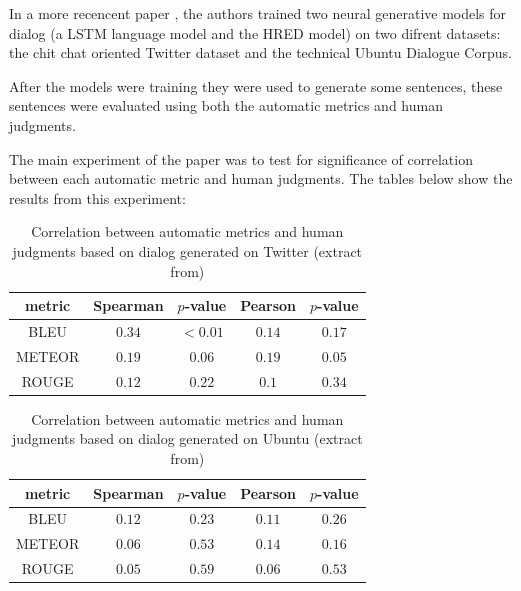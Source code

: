 In a more recencent paper \cite{LiuLSNCP16}, the authors trained two neural generative models for dialog (a LSTM language model and the HRED model) on two difrent datasets: the chit chat oriented Twitter dataset and the technical Ubuntu Dialogue Corpus.

After the models were training they were used to generate some sentences, these sentences were evaluated using both the automatic metrics and human judgments. 

The main experiment of the paper was to test for significance of correlation between each automatic metric and  human judgments. The tables below show the results from this experiment:

\begin{table}[h]
\centering
\label{hownottable}
\begin{tabular}{|c|c|c|c|c|}
\hline
\cellcolor{blue!10} metric & \cellcolor{blue!10} Spearman & \cellcolor{blue!10} $p$-value & \cellcolor{blue!10} Pearson &  \cellcolor{blue!10} $p$-value \\ \hline
BLEU   & $0.34$   & $< 0.01$  & $0.14$  & $0.17$ \\ \hline
METEOR & $0.19$   & $0.06$    & $0.19$  & $0.05$ \\ \hline
ROUGE  & $0.12$   & $0.22$    & $0.1$   & $0.34$ \\ \hline  
\end{tabular}
\caption{Correlation between automatic metrics and human judgments based on dialog generated on Twitter
(extract from\cite{LiuLSNCP16})}
\end{table}


\begin{table}[h]
\centering
\label{hownottable}
\begin{tabular}{|c|c|c|c|c|}
\hline
\cellcolor{blue!10} metric & \cellcolor{blue!10} Spearman & \cellcolor{blue!10} $p$-value & \cellcolor{blue!10} Pearson &  \cellcolor{blue!10} $p$-value \\ \hline
BLEU & $0.12$   & $0.23$    & $0.11$  & $0.26$    \\ \hline
METEOR & $0.06$   & $0.53$    & $0.14$  & $0.16$     \\ \hline
ROUGE & $0.05$   & $0.59$    & $0.06$  & $0.53$    \\ \hline
\end{tabular}
\caption{Correlation between automatic metrics and human judgments based on dialog generated on Ubuntu (extract from\cite{LiuLSNCP16})}
\end{table}


